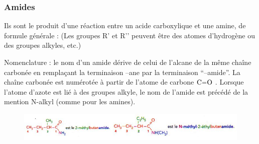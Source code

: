 \documentclass[11pt,a4paper]{article}
\begin{document}
\subsubsection*{Amides}
Ils sont le produit d’une réaction entre un acide carboxylique et une amine, de formule générale :
(Les groupes R’ et R’’ peuvent être des atomes d’hydrogène ou des groupes alkyles, etc.)

Nomenclature : le nom d’un amide dérive de celui de l’alcane de la même chaîne carbonée en remplaçant la terminaison  –ane par la terminaison ``–amide''. La chaîne carbonée est numérotée à partir de l’atome de carbone $\ce{C=O}$ . Lorsque l’atome d’azote est lié à des groupes alkyle, le nom de l’amide est précédé de la mention N-alkyl (comme pour les amines).   

\begin{figure}[H]
    \centering
    \includegraphics[width=\linewidth]{imgs/c5/exAmide.jpg}
\end{figure}
\end{document}
